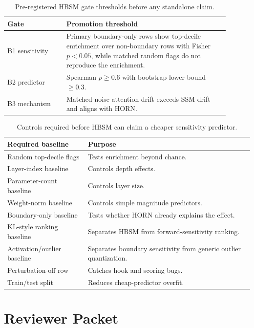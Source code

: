 \documentclass{article}
\begin{document}
\begin{table}[h]
\centering
\small
\begin{tabular}{p{0.24\linewidth}p{0.66\linewidth}}
\toprule
Gate & Promotion threshold \\
\midrule
B1 sensitivity & Primary boundary-only rows show top-decile enrichment over non-boundary rows with Fisher $p<0.05$, while matched random flags do not reproduce the enrichment. \\
B2 predictor & Spearman $\rho \ge 0.6$ with bootstrap lower bound $\ge 0.3$. \\
B3 mechanism & Matched-noise attention drift exceeds SSM drift and aligns with HORN. \\
\bottomrule
\end{tabular}
\caption{Pre-registered HBSM gate thresholds before any standalone claim.}
\end{table}

\begin{table}[h]
\centering
\small
\begin{tabular}{ll}
\toprule
Required baseline & Purpose \\
\midrule
Random top-decile flags & Tests enrichment beyond chance. \\
Layer-index baseline & Controls depth effects. \\
Parameter-count baseline & Controls layer size. \\
Weight-norm baseline & Controls simple magnitude predictors. \\
Boundary-only baseline & Tests whether HORN already explains the effect. \\
KL-style ranking baseline & Separates HBSM from forward-sensitivity ranking. \\
Activation/outlier baseline & Separates boundary sensitivity from generic outlier quantization. \\
Perturbation-off row & Catches hook and scoring bugs. \\
Train/test split & Reduces cheap-predictor overfit. \\
\bottomrule
\end{tabular}
\caption{Controls required before HBSM can claim a cheaper sensitivity predictor.}
\end{table}

\section{Reviewer Packet}
\end{document}
